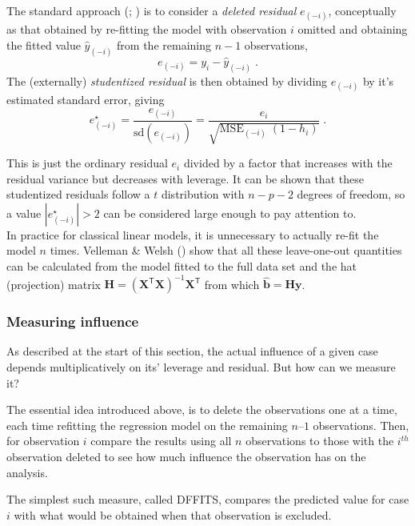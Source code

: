 \documentclass[
  letterpaper,
  10pt,
  krantz2]{krantz}
\begin{document}
The standard approach (; ) is to consider a \emph{deleted residual} \(e_{(-i)}\),
conceptually as that obtained by re-fitting the model with observation
\(i\) omitted and obtaining the fitted value \(\hat{y}_{(-i)}\) from the
remaining \(n-1\) observations, \[
e_{(-i)} = y_i - \hat{y}_{(-i)} \; .
\] The (externally) \emph{studentized residual} is then obtained by
dividing \(e_{(-i)}\) by it's estimated standard error, giving \[
e^\star_{(-i)} = \frac{e_{(-i)}}{\text{sd}(e_{(-i)})} = \frac{e_i}{\sqrt{\text{MSE}_{(-i)}\; (1 - h_i)}} \; .
\]

This is just the ordinary residual \(e_i\) divided by a factor that
increases with the residual variance but decreases with leverage. It can
be shown that these studentized residuals follow a \(t\) distribution
with \(n - p -2\) degrees of freedom, so a value
\(|e^\star_{(-i)}| > 2\) can be considered large enough to pay attention
to.\\
In practice for classical linear models, it is unnecessary to actually
re-fit the model \(n\) times. Velleman \& Welsh
() show that all these
leave-one-out quantities can be calculated from the model fitted to the
full data set and the hat (projection) matrix
\(\mathbf{H} = (\mathbf{X}^\mathsf{T}\mathbf{X})^{-1} \mathbf{X}^\mathsf{T}\)
from which \(\widehat{\mathbf{b}} = \mathbf{H} \mathbf{y}\).

\subsubsection{Measuring influence}\label{measuring-influence}

As described at the start of this section, the actual influence of a
given case depends multiplicatively on its' leverage and residual. But
how can we measure it?

The essential idea introduced above, is to delete the observations one
at a time, each time refitting the regression model on the remaining
\(n–1\) observations. Then, for observation \(i\) compare the results
using all \(n\) observations to those with the \(i^{th}\) observation
deleted to see how much influence the observation has on the analysis.

The simplest such measure, called DFFITS, compares the predicted value
for case \(i\) with what would be obtained when that observation is
excluded.
\end{document}
